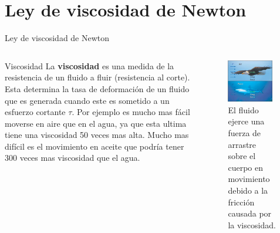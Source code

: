 \documentclass [xcolor=svgnames, t] {beamer}
\begin{document}
\section{Ley de viscosidad de Newton}
\begin{frame}{Ley de viscosidad de Newton}
\vspace{-0.5cm}
\begin{columns}
\begin{block}{Viscosidad}
La \textbf{viscosidad} es una medida de la resistencia de un fluido a fluir (resistencia al corte). Esta determina la tasa de deformaci\'on de un fluido que es generada cuando este es sometido a un esfuerzo cortante $\tau$. Por ejemplo es mucho mas f\'acil moverse en aire que en el agua, ya que esta ultima tiene una viscosidad 50 veces mas alta. Mucho mas dif\'icil es el movimiento en aceite que podr\'ia tener 300 veces mas viscosidad que el agua. 
\end{block}
\begin{figure}[h]
\centering
\includegraphics[width=0.9\textwidth]{visco0}
\caption{El fluido ejerce una fuerza de arrastre sobre el cuerpo en movimiento debido a la fricci\'on causada por la viscosidad.}
\end{figure}
\end{columns}
\end{frame}
\end{document}
